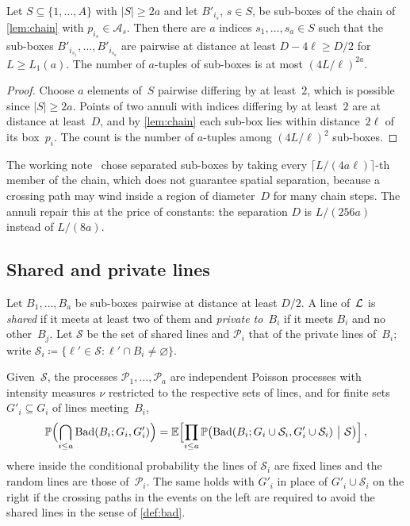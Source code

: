 \documentclass[11pt,letterpaper]{article}
\newcommand{\Bad}{\mathrm{Bad}}
\begin{document}
\begin{lemma}
\label{lem:separated}
Let $S\subseteq\{1,\dots,A\}$ with $\lvert S\rvert\ge2a$ and let $B'_{i_s}$, $s\in S$, be sub-boxes of the chain of \cref{lem:chain} with $p_{i_s}\in\mathcal A_s$. Then there are $a$ indices $s_1,\dots,s_a\in S$ such that the sub-boxes $B'_{i_{s_1}},\dots,B'_{i_{s_a}}$ are pairwise at distance at least $D-4\ell\ge D/2$ for $L\ge L_1(a)$. The number of $a$-tuples of sub-boxes is at most $(4L/\ell)^{2a}$.
\end{lemma}

\begin{proof}
Choose $a$ elements of~$S$ pairwise differing by at least~$2$, which is possible since $\lvert S\rvert\ge2a$. Points of two annuli with indices differing by at least~$2$ are at distance at least~$D$, and by \cref{lem:chain} each sub-box lies within distance~$2\ell$ of its box~$p_i$. The count is the number of $a$-tuples among $(4L/\ell)^2$ sub-boxes.
\end{proof}

\begin{remark}
The working note~\cite{MS26} chose separated sub-boxes by taking every $\lceil L/(4a\ell)\rceil$-th member of the chain, which does not guarantee spatial separation, because a crossing path may wind inside a region of diameter~$D$ for many chain steps. The annuli repair this at the price of constants: the separation $D$ is $L/(256a)$ instead of $L/(8a)$.
\end{remark}

\subsection{Shared and private lines}

Let $B_1,\dots,B_a$ be sub-boxes pairwise at distance at least $D/2$. A line of~$\mathcal L$ is \emph{shared} if it meets at least two of them and \emph{private to~$B_i$} if it meets $B_i$ and no other~$B_j$. Let $\mathcal S$ be the set of shared lines and $\mathcal P_i$ that of the private lines of~$B_i$; write $\mathcal S_i\coloneqq\{\ell'\in\mathcal S\colon\ell'\cap B_i\neq\varnothing\}$.

\begin{lemma}
\label{lem:condind}
Given~$\mathcal S$, the processes $\mathcal P_1,\dots,\mathcal P_a$ are independent Poisson processes with intensity measures $\nu$ restricted to the respective sets of lines, and for finite sets $G'_i\subseteq G_i$ of lines meeting~$B_i$,
\begin{equation}
\label{eq:condind}
  \P\Bigl(\bigcap_{i\le a}\Bad(B_i;G_i,G'_i)\Bigr)=\E\Bigl[\prod_{i\le a}\P\bigl(\Bad(B_i;G_i\cup\mathcal S_i,G'_i\cup\mathcal S_i)\ \big\vert\ \mathcal S\bigr)\Bigr]\,,
\end{equation}
where inside the conditional probability the lines of $\mathcal S_i$ are fixed lines and the random lines are those of~$\mathcal P_i$. The same holds with $G'_i$ in place of $G'_i\cup\mathcal S_i$ on the right if the crossing paths in the events on the left are required to avoid the shared lines in the sense of \cref{def:bad}.
\end{lemma}
\end{document}
